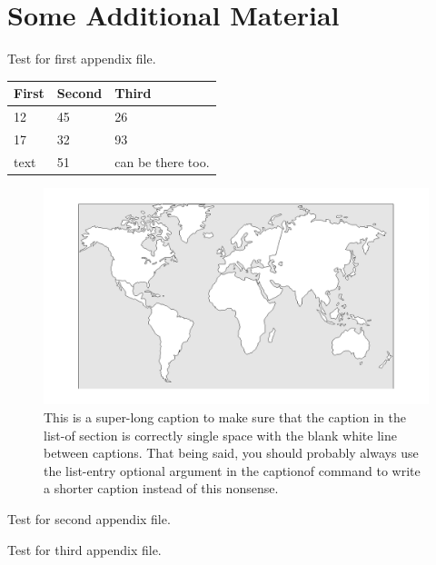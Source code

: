 \chapter{Some Additional Material}

Test for first appendix file.


\begin{table}[htbp]%
    \label{first}
    \begin{tabularx}{6.5in}{XXX}
      \hline
      First & Second & Third \\
      \hline
      12 & 45 & 26 \\
      17 & 32 & 93 \\
      text & 51 & can be there too. \\	
      \hline
    \end{tabularx}
\end{table}


\begin{figure}[h]
    \centering
    \includegraphics[scale=.2]{theworld.png}
    \caption[Figure Caption]{This is a super-long caption to make sure that the caption in the list-of section is correctly single space with the blank white line between captions. That being said, you should probably always use the list-entry optional argument in the captionof command to write a shorter caption instead of this nonsense.}
    \label{fig:my_label}
\end{figure}

Test for second appendix file.



Test for third appendix file.


